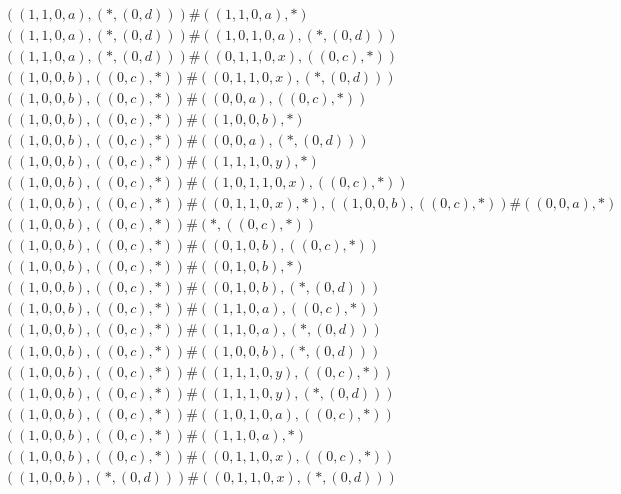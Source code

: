 \begin{align*}
	 & \qquad ((1, 1, 0, a), (*, (0, d))) \# ((1, 1, 0, a), *) \\ 
	 & \qquad ((1, 1, 0, a), (*, (0, d))) \# ((1, 0, 1, 0, a), (*, (0, d))) \\ 
	 & \qquad ((1, 1, 0, a), (*, (0, d))) \# ((0, 1, 1, 0, x), ((0, c), *)) \\ 
	 & \qquad ((1, 0, 0, b), ((0, c), *)) \# ((0, 1, 1, 0, x), (*, (0, d))) \\ 
	 & \qquad ((1, 0, 0, b), ((0, c), *)) \# ((0, 0, a), ((0, c), *)) \\ 
	 & \qquad ((1, 0, 0, b), ((0, c), *)) \# ((1, 0, 0, b), *) \\ 
	 & \qquad ((1, 0, 0, b), ((0, c), *)) \# ((0, 0, a), (*, (0, d))) \\ 
	 & \qquad ((1, 0, 0, b), ((0, c), *)) \# ((1, 1, 1, 0, y), *) \\ 
	 & \qquad ((1, 0, 0, b), ((0, c), *)) \# ((1, 0, 1, 1, 0, x), ((0, c), *)) \\ 
	 & \qquad ((1, 0, 0, b), ((0, c), *)) \# ((0, 1, 1, 0, x), *), ((1, 0, 0, b), ((0, c), *)) \# ((0, 0, a), *) \\ 
	 & \qquad ((1, 0, 0, b), ((0, c), *)) \# (*, ((0, c), *)) \\ 
	 & \qquad ((1, 0, 0, b), ((0, c), *)) \# ((0, 1, 0, b), ((0, c), *)) \\ 
	 & \qquad ((1, 0, 0, b), ((0, c), *)) \# ((0, 1, 0, b), *) \\ 
	 & \qquad ((1, 0, 0, b), ((0, c), *)) \# ((0, 1, 0, b), (*, (0, d))) \\ 
	 & \qquad ((1, 0, 0, b), ((0, c), *)) \# ((1, 1, 0, a), ((0, c), *)) \\ 
	 & \qquad ((1, 0, 0, b), ((0, c), *)) \# ((1, 1, 0, a), (*, (0, d))) \\ 
	 & \qquad ((1, 0, 0, b), ((0, c), *)) \# ((1, 0, 0, b), (*, (0, d))) \\ 
	 & \qquad ((1, 0, 0, b), ((0, c), *)) \# ((1, 1, 1, 0, y), ((0, c), *)) \\ 
	 & \qquad ((1, 0, 0, b), ((0, c), *)) \# ((1, 1, 1, 0, y), (*, (0, d))) \\ 
	 & \qquad ((1, 0, 0, b), ((0, c), *)) \# ((1, 0, 1, 0, a), ((0, c), *)) \\ 
	 & \qquad ((1, 0, 0, b), ((0, c), *)) \# ((1, 1, 0, a), *) \\ 
	 & \qquad ((1, 0, 0, b), ((0, c), *)) \# ((0, 1, 1, 0, x), ((0, c), *)) \\ 
	 & \qquad ((1, 0, 0, b), (*, (0, d))) \# ((0, 1, 1, 0, x), (*, (0, d))) \\ 

\end{align*}
